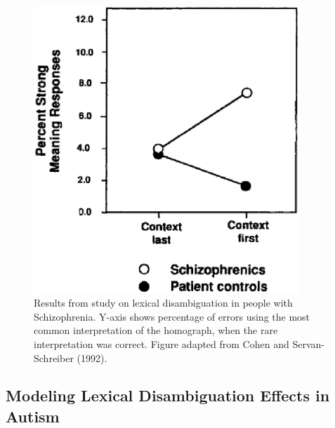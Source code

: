 \begin{figure}[tp]
\begin{center}
	\includegraphics[width=100mm]{figures/schiz_lexamb_study_results.eps}
\end{center}
\caption{Results from study on lexical disambiguation in people with Schizophrenia.  Y-axis shows percentage of errors using the most common interpretation of the homograph, when the rare interpretation was correct.  Figure adapted from Cohen and Servan-Schreiber (1992).}
\label{schiz-lexamb-study}
\end{figure} 

\subsection{Modeling Lexical Disambiguation Effects in Autism}

